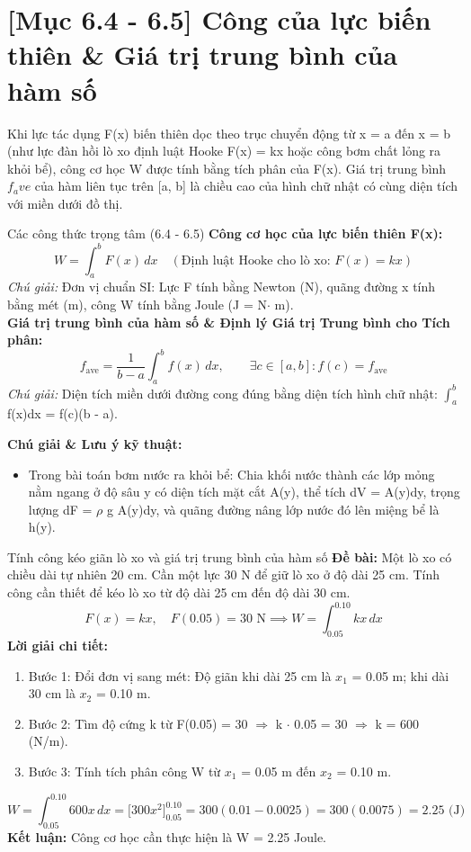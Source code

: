 \documentclass[11pt,a4paper,oneside]{book}
\begin{document}
\section{[Mục 6.4 - 6.5] Công của lực biến thiên \& Giá trị trung bình của hàm số}
Khi lực tác dụng F(x) biến thiên dọc theo trục chuyển động từ x = a đến x = b (như lực đàn hồi lò xo định luật Hooke F(x) = kx hoặc công bơm chất lỏng ra khỏi bể), công cơ học W được tính bằng tích phân của F(x). Giá trị trung bình $f_ave$ của hàm liên tục trên [a, b] là chiều cao của hình chữ nhật có cùng diện tích với miền dưới đồ thị.

\begin{congthuc}{Các công thức trọng tâm (6.4 - 6.5)}
\noindent\textbf{Công cơ học của lực biến thiên F(x):}
\[ W = \int_a^b F(x)\,dx \quad (\text{Định luật Hooke cho lò xo: } F(x) = kx) \]
\noindent\textit{Chú giải:} Đơn vị chuẩn SI: Lực F tính bằng Newton (N), quãng đường x tính bằng mét (m), công W tính bằng Joule (J = N$\cdot$ m).\\[4pt]
\noindent\textbf{Giá trị trung bình của hàm số \& Định lý Giá trị Trung bình cho Tích phân:}
\[ f_{\text{ave}} = \frac{1}{b - a} \int_a^b f(x)\,dx, \qquad \exists c \in [a, b] : f(c) = f_{\text{ave}} \]
\noindent\textit{Chú giải:} Diện tích miền dưới đường cong đúng bằng diện tích hình chữ nhật: $\int_a^b$ f(x)dx = f(c)(b - a).\\[4pt]
\end{congthuc}

\noindent\textbf{Chú giải \& Lưu ý kỹ thuật:}
\begin{itemize}[leftmargin=1.5em, itemsep=2pt]
  \item Trong bài toán bơm nước ra khỏi bể: Chia khối nước thành các lớp mỏng nằm ngang ở độ sâu y có diện tích mặt cắt A(y), thể tích dV = A(y)dy, trọng lượng dF = $\rho$ g A(y)dy, và quãng đường nâng lớp nước đó lên miệng bể là h(y).
\end{itemize}

\begin{vidu}{Tính công kéo giãn lò xo và giá trị trung bình của hàm số}
\textbf{Đề bài:} Một lò xo có chiều dài tự nhiên 20 cm. Cần một lực 30 N để giữ lò xo ở độ dài 25 cm. Tính công cần thiết để kéo lò xo từ độ dài 25 cm đến độ dài 30 cm.
\[ F(x) = kx, \quad F(0.05) = 30 \text{ N} \implies W = \int_{0.05}^{0.10} kx\,dx \]
\textbf{Lời giải chi tiết:}
\begin{enumerate}[leftmargin=1.5em, itemsep=2pt]
  \item Bước 1: Đổi đơn vị sang mét: Độ giãn khi dài 25 cm là $x_1$ = 0.05 m; khi dài 30 cm là $x_2$ = 0.10 m.
  \item Bước 2: Tìm độ cứng k từ F(0.05) = 30 $\Rightarrow$  k $\cdot$  0.05 = 30 $\Rightarrow$  k = 600 (N/m).
  \item Bước 3: Tính tích phân công W từ $x_1$ = 0.05 m đến $x_2$ = 0.10 m.
\end{enumerate}
\[ W = \int_{0.05}^{0.10} 600x\,dx = \Big[300x^2\Big]_{0.05}^{0.10} = 300(0.01 - 0.0025) = 300(0.0075) = 2.25 \text{ (J)} \]
\noindent\textbf{Kết luận:} Công cơ học cần thực hiện là W = 2.25 Joule.
\end{vidu}
\end{document}

